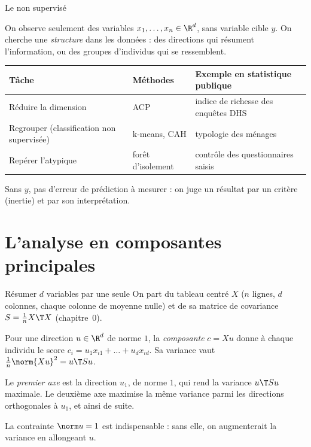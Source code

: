 \documentclass[aspectratio=169,11pt]{beamer}
\begin{document}
\begin{frame}{Le non supervisé}
  \begin{definition}
    On observe seulement des variables $x_1,\dots,x_n\in\R^d$, sans variable cible $y$. On cherche une \emph{structure} dans les données : des directions qui résument l'information, ou des groupes d'individus qui se ressemblent.
  \end{definition}
  \begin{center}
    \small\renewcommand{\arraystretch}{1.3}
    \begin{tabular}{p{}p{}p{}}
      \toprule
      \textbf{Tâche} & \textbf{Méthodes} & \textbf{Exemple en statistique publique} \\
      \midrule
      Réduire la dimension & ACP & indice de richesse des enquêtes DHS \\
      Regrouper (classification non supervisée) & k-means, CAH & typologie des ménages \\
      Repérer l'atypique & forêt d'isolement & contrôle des questionnaires saisis \\
      \bottomrule
    \end{tabular}
  \end{center}
  {\small\color{cnfGris}Sans $y$, pas d'erreur de prédiction à mesurer : on juge un résultat par un critère (inertie) et par son interprétation.}
\end{frame}

\section{L'analyse en composantes principales}

\begin{frame}{Résumer $d$ variables par une seule}
  On part du tableau centré $X$ ($n$ lignes, $d$ colonnes, chaque colonne de moyenne nulle) et de sa matrice de covariance $S=\frac1nX\T X$ (chapitre~0).
  \begin{definition}
    Pour une direction $u\in\R^d$ de norme $1$, la \emph{composante} $c=Xu$ donne à chaque individu le score $c_i=u_1x_{i1}+\dots+u_dx_{id}$. Sa variance vaut $\frac1n\norm{Xu}^2=u\T Su$.
  \end{definition}
  \begin{definition}
    Le \emph{premier axe} est la direction $u_1$, de norme $1$, qui rend la variance $u\T Su$ maximale. Le deuxième axe maximise la même variance parmi les directions orthogonales à $u_1$, et ainsi de suite.
  \end{definition}
  {\small\color{cnfGris}La contrainte $\norm u=1$ est indispensable : sans elle, on augmenterait la variance en allongeant $u$.}
\end{frame}
\end{document}
